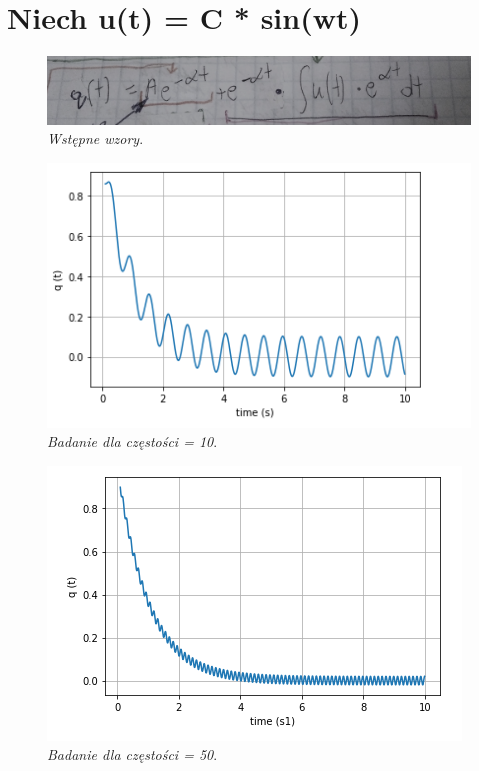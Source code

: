 \documentclass[12pt,oneside,a4paper]{book} %
\begin{document}
\section{Niech u(t) = C * sin(wt)}


\begin{figure}[h]
\begin{center} 
\includegraphics[scale=0.5]{./images/001.PNG} 
\caption{\textit{Wstępne wzory}.\newline }
\label{rys:logoup}
\end{center}
\end{figure}


\begin{figure}[h]
\begin{center} 
\includegraphics[scale=0.8]{./images/czestosc=10.PNG} 
\caption{\textit{Badanie dla częstości = 10}.\newline }
\label{rys:logoup}
\end{center}
\end{figure}


\begin{figure}[h]
\begin{center} 
\includegraphics[scale=0.8]{./images/czestosc=50.PNG} 
\caption{\textit{Badanie dla częstości = 50}.\newline }
\label{rys:logoup}
\end{center}
\end{figure}
\end{document}
